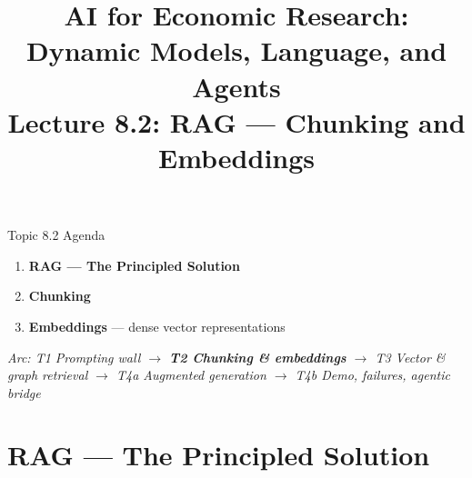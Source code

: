


\usetikzlibrary{arrows.meta, positioning, shapes.geometric, fit, calc, backgrounds}

\graphicspath{{./pic/}{./figures/}{../../MiniCourse_8hr/Slides/Module4_Agentic_AI/pic/}{../}}

\title[AI for Econ Research]{AI for Economic Research: Dynamic Models, Language, and Agents\\
Lecture 8.2: RAG --- Chunking and Embeddings}



\makebeamertitle

\begin{frame}{Topic 8.2 Agenda}
\begin{enumerate}
  \item \textbf{RAG --- The Principled Solution}
  \medskip
  \item \textbf{Chunking}
  \medskip
  \item \textbf{Embeddings} --- dense vector representations
\end{enumerate}

\medskip
\textit{Arc: T1 Prompting wall $\to$ \textbf{T2 Chunking \& embeddings} $\to$ T3 Vector \& graph retrieval $\to$ T4a Augmented generation $\to$ T4b Demo, failures, agentic bridge}
\end{frame}

\section{RAG --- The Principled Solution}

